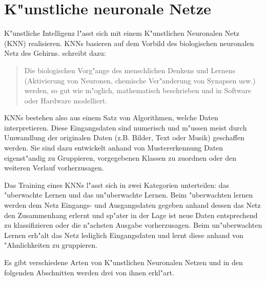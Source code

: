 \chapter{K"unstliche neuronale Netze}
{
K"unstliche Intelligenz l"asst sich mit einem K"unstlichen Neuronalen Netz (KNN) realisieren. KNNs basieren auf dem Vorbild des biologischen neuronalen Netz des Gehirns.
\cite{Breitner} schreibt dazu:
\begin{quote}{\glqq}Die biologischen Vorg"ange des menschlichen Denkens und Lernens (Aktivierung von Neuronen, chemische Ver"anderung von Synapsen usw.) werden, so gut wie m"oglich, mathematisch beschrieben und in Software oder Hardware modelliert.{\grqq}\end{quote}
KNNs bestehen also aus einem Satz von Algorithmen, welche Daten interpretieren. Diese Eingangsdaten sind numerisch und m"ussen meist durch Umwandlung der originalen Daten (z.B. Bilder, Text oder Musik) geschaffen werden. Sie sind dazu entwickelt anhand von Mustererkennung Daten eigenst"andig zu Gruppieren, vorgegebenen Klassen zu zuordnen oder den weiteren Verlauf vorherzusagen.

Das Training eines KNNs l"asst sich in zwei Kategorien unterteilen: das "uberwachte Lernen und das un"uberwachte Lernen. Beim "uberwachten lernen werden dem Netz Eingangs- und Ausgangsdaten gegeben anhand dessen das Netz den Zusammenhang erlernt und sp"ater in der Lage ist neue Daten entsprechend zu klassifizieren oder die n"achsten Ausgabe vorherzusagen. Beim un"uberwachten Lernen erh"alt das Netz lediglich Eingangsdaten und lernt diese anhand von "Ahnlichkeiten  zu gruppieren.

Es gibt verschiedene Arten von K"unstlichen Neuronalen Netzen und in den folgenden Abschnitten werden drei von ihnen erkl"art.


}
